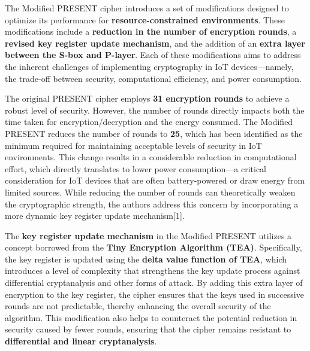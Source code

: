 \documentclass{article}
\begin{document}
The Modified PRESENT cipher introduces a set of modifications designed to optimize its performance for \textbf{resource-constrained environments}. These modifications include a \textbf{reduction in the number of encryption rounds}, a \textbf{revised key register update mechanism}, and the addition of an \textbf{extra layer between the S-box and P-layer}. Each of these modifications aims to address the inherent challenges of implementing cryptography in IoT devices—namely, the trade-off between security, computational efficiency, and power consumption.

The original PRESENT cipher employs \textbf{31 encryption rounds} to achieve a robust level of security. However, the number of rounds directly impacts both the time taken for encryption/decryption and the energy consumed. The Modified PRESENT reduces the number of rounds to \textbf{25}, which has been identified as the minimum required for maintaining acceptable levels of security in IoT environments. This change results in a considerable reduction in computational effort, which directly translates to lower power consumption—a critical consideration for IoT devices that are often battery-powered or draw energy from limited sources. While reducing the number of rounds can theoretically weaken the cryptographic strength, the authors address this concern by incorporating a more dynamic key register update mechanism[1].




The \textbf{key register update mechanism} in the Modified PRESENT utilizes a concept borrowed from the \textbf{Tiny Encryption Algorithm (TEA)}. Specifically, the key register is updated using the \textbf{delta value function of TEA}, which introduces a level of complexity that strengthens the key update process against differential cryptanalysis and other forms of attack. By adding this extra layer of encryption to the key register, the cipher ensures that the keys used in successive rounds are not predictable, thereby enhancing the overall security of the algorithm. This modification also helps to counteract the potential reduction in security caused by fewer rounds, ensuring that the cipher remains resistant to \textbf{differential and linear cryptanalysis}.
\end{document}

